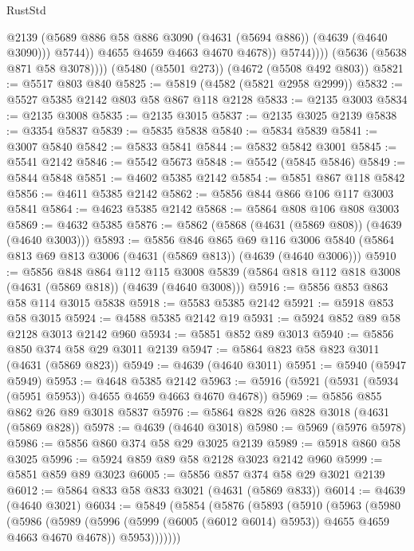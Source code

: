 \begin{lexlean}{RustStd}
\begin{coremodule}
                        @2139
                        (@5689 @886 @58 @886 @3090 (@4631 (@5694 @886)) (@4639 (@4640 @3090)))
                        @5744))
                    @4655
                    @4659
                    @4663
                    @4670
                    @4678))
                @5744))))
        (@5636 (@5638 @871 @58 @3078))))
    (@5480 (@5501 @273))
    (@4672 (@5508 @492 @803))
@5821 := @5517 @803 @840
@5825 := @5819 (@4582 (@5821 @2958 @2999))
@5832 := @5527 @5385 @2142 @803 @58 @867 @118 @2128
@5833 := @2135 @3003
@5834 := @2135 @3008
@5835 := @2135 @3015
@5837 := @2135 @3025 @2139
@5838 := @3354 @5837
@5839 := @5835 @5838
@5840 := @5834 @5839
@5841 := @3007 @5840
@5842 := @5833 @5841
@5844 := @5832 @5842 @3001
@5845 := @5541 @2142
@5846 := @5542 @5673
@5848 := @5542 (@5845 @5846)
@5849 := @5844 @5848
@5851 := @4602 @5385 @2142
@5854 := @5851 @867 @118 @5842
@5856 := @4611 @5385 @2142
@5862 := @5856 @844 @866 @106 @117 @3003 @5841
@5864 := @4623 @5385 @2142
@5868 := @5864 @808 @106 @808 @3003
@5869 := @4632 @5385
@5876 := @5862 (@5868 (@4631 (@5869 @808)) (@4639 (@4640 @3003)))
@5893 := @5856
    @846
    @865
    @69
    @116
    @3006
    @5840
    (@5864 @813 @69 @813 @3006 (@4631 (@5869 @813)) (@4639 (@4640 @3006)))
@5910 := @5856
    @848
    @864
    @112
    @115
    @3008
    @5839
    (@5864 @818 @112 @818 @3008 (@4631 (@5869 @818)) (@4639 (@4640 @3008)))
@5916 := @5856 @853 @863 @58 @114 @3015 @5838
@5918 := @5583 @5385 @2142
@5921 := @5918 @853 @58 @3015
@5924 := @4588 @5385 @2142 @19
@5931 := @5924 @852 @89 @58 @2128 @3013 @2142 @960
@5934 := @5851 @852 @89 @3013
@5940 := @5856 @850 @374 @58 @29 @3011 @2139
@5947 := @5864 @823 @58 @823 @3011 (@4631 (@5869 @823))
@5949 := @4639 (@4640 @3011)
@5951 := @5940 (@5947 @5949)
@5953 := @4648 @5385 @2142
@5963 := @5916 (@5921 (@5931 (@5934 (@5951 @5953)) @4655 @4659 @4663 @4670 @4678))
@5969 := @5856 @855 @862 @26 @89 @3018 @5837
@5976 := @5864 @828 @26 @828 @3018 (@4631 (@5869 @828))
@5978 := @4639 (@4640 @3018)
@5980 := @5969 (@5976 @5978)
@5986 := @5856 @860 @374 @58 @29 @3025 @2139
@5989 := @5918 @860 @58 @3025
@5996 := @5924 @859 @89 @58 @2128 @3023 @2142 @960
@5999 := @5851 @859 @89 @3023
@6005 := @5856 @857 @374 @58 @29 @3021 @2139
@6012 := @5864 @833 @58 @833 @3021 (@4631 (@5869 @833))
@6014 := @4639 (@4640 @3021)
@6034 := @5849
    (@5854
      (@5876
        (@5893
          (@5910
            (@5963
              (@5980
                (@5986
                  (@5989 (@5996 (@5999 (@6005 (@6012 @6014) @5953)) @4655 @4659 @4663 @4670 @4678))
                  @5953)))))))

\end{coremodule}
\end{lexlean}
